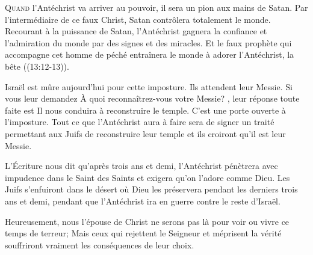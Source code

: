 


\lettrine{Q}{uand} l'Antéchrist va arriver au pouvoir, 
 il sera un pion aux mains de Satan. Par l'intermédiaire de ce faux Christ,
 Satan contrôlera totalement le monde. Recourant à la puissance de Satan,
 l'Antéchrist gagnera la confiance et l'admiration du monde
 par des signes et des miracles.
 Et le faux prophète qui accompagne cet homme de péché entraînera le monde
 à adorer l'Antéchrist, la \Og bête \Fg{} ((13:12-13)). 



Israël est mûre aujourd'hui pour cette imposture. Ils attendent leur Messie.
 Si vous leur demandez\frcolon{} 
 \Og À quoi reconnaîtrez-vous votre Messie? \Fg{},
 leur réponse toute faite est\frcolon{} 
 \Og Il nous conduira à reconstruire le temple. \Fg{}
 C'est une porte ouverte à l'imposture. Tout ce que l'Antéchrist
 aura à faire sera de signer un traité permettant aux Juifs
 de reconstruire leur temple \ocadr et ils croiront qu'il est leur Messie. 

L'Écriture nous dit qu'après trois ans et demi,
 l'Antéchrist pénètrera avec impudence dans le Saint des Saints
 et exigera qu'on l'adore comme Dieu. Les Juifs s'enfuiront dans le désert
 où Dieu les préservera pendant les derniers trois ans et demi,
 pendant que l'Antéchrist ira en guerre contre le reste d'Israël. 

Heureusement, nous \ocadr l'épouse de Christ \fcadr{} ne serons pas là
 pour voir ou vivre ce temps de terreur; Mais ceux qui rejettent le Seigneur
 et méprisent 
 la vérité souffriront vraiment les conséquences 
 de leur choix. 

\dvrule



